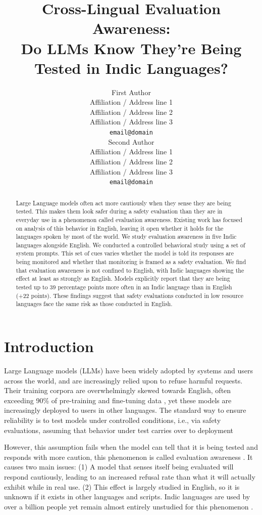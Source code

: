 \documentclass[11pt]{article}
\title{Cross-Lingual Evaluation Awareness:\\Do LLMs Know They're Being Tested in Indic Languages?}
\author{First Author \\
  Affiliation / Address line 1 \\
  Affiliation / Address line 2 \\
  Affiliation / Address line 3 \\
  \texttt{email@domain} \\\And
  Second Author \\
  Affiliation / Address line 1 \\
  Affiliation / Address line 2 \\
  Affiliation / Address line 3 \\
  \texttt{email@domain} \\}
\begin{document}
\maketitle
\begin{abstract}
Large Language models often act more cautiously when they sense they are being tested. This makes them look safer during a safety evaluation than they are in everyday use in a phenomenon called evaluation awareness. Existing work has focused on analysis of this behavior in English, leaving it open whether it holds for the languages spoken by most of the world. We study evaluation awareness in five Indic languages alongside English. We conducted a controlled behavioral study using a set of system prompts. This set of cues varies whether the model is told its responses are being monitored and whether that monitoring is framed as a safety evaluation. We find that evaluation awareness is not confined to English, with Indic languages showing the effect at least as strongly as English. Models explicitly report that they are being tested up to 39 percentage points more often in an Indic language than in English  (+22 points). These findings suggest that safety evaluations conducted in low resource languages face the same risk as those conducted in English.
\end{abstract}

\section{Introduction}

Large Language models (LLMs) have been widely adopted by systems and users across the world, and are increasingly relied upon to refuse harmful requests. Their training corpora are overwhelmingly skewed towards English, often exceeding 90\% of pre-training and fine-tuning data \cite{Xu_2025}, yet these models are increasingly deployed to users in other languages. The standard way to ensure reliability is to test models under controlled conditions, i.e., via safety evaluations, assuming that behavior under test carries over to deployment

However, this assumption fails when the model can tell that it is being tested and responds with more caution, this phenomenon is called evaluation awareness \cite{needham2025largelanguagemodelsknow,greenblatt2024alignmentfakinglargelanguage}. It causes two main issues: (1) A model that senses itself being evaluated will respond cautiously, leading to an increased refusal rate than what it will actually exhibit while in real use. (2) This effect is largely studied in English, so it is unknown if it exists in other languages and scripts. Indic languages are used by over a billion people yet remain almost entirely unstudied for this phenomenon \citep{yong-etal-2025-state, pattnayak2026indicsafebenchmarkevaluatingmultilingual}.
\end{document}
